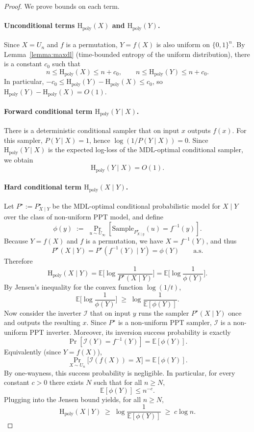 \documentclass[twoside]{article}
\newcommand{\E}{\mathbb{E}}
\newcommand{\rH}{\mathrm{H}}
\begin{document}
\begin{proof}
We prove bounds on each term.

\paragraph{Unconditional terms $\rH_{\mathrm{poly}}(X)$ and $\rH_{\mathrm{poly}}(Y)$.}
Since $X= U_n$ and $f$ is a permutation, $Y=f(X)$ is also uniform on $\{0,1\}^n$.
By Lemma~\ref{lemma:maxdl} (time-bounded entropy of the uniform distribution),
there is a constant $c_0$ such that
\[
n \le \rH_{\mathrm{poly}}(X) \le n+c_0,\qquad n \le \rH_{\mathrm{poly}}(Y) \le n+c_0.
\]
In particular, $-c_0 \leq \rH_{\mathrm{poly}}(Y)-\rH_{\mathrm{poly}}(X)\leq c_0$, so $\rH_{\mathrm{poly}}(Y)-\rH_{\mathrm{poly}}(X) = O(1)$.

\paragraph{Forward conditional term $\rH_{\mathrm{poly}}(Y\mid X)$.}
There is a deterministic conditional sampler that on input $x$ outputs $f(x)$.
For this sampler, $P(Y\mid X)=1$, hence $\log(1/P(Y\mid X))=0$.
Since $\rH_{\mathrm{poly}}(Y\mid X)$ is the expected log-loss of the MDL-optimal conditional sampler,
we obtain
\[
\rH_{\mathrm{poly}}(Y\mid X)=O(1).
\]

\paragraph{Hard conditional term $\rH_{\mathrm{poly}}(X\mid Y)$.}
Let $P^\star:=P^\star_{X\mid Y}$ be the MDL-optimal conditional probabilistic model for $X\mid Y$
over the class of non-uniform PPT model, and define
%
%
%
\[
\phi(y)\;:=\; \Pr_{u\sim U_\infty}\left[\mathrm{Sample}_{P^\star_{X\mid y}}(u) = f^{-1}(y)\right].
\]
Because $Y=f(X)$ and $f$ is a permutation, we have $X=f^{-1}(Y)$, and thus
\[
P^\star(X\mid Y)=P^\star(f^{-1}(Y)\mid Y)=\phi(Y)\qquad\text{a.s.}
\]
Therefore
\[
\rH_{\mathrm{poly}}(X\mid Y)
=\E\Big[\log\frac{1}{P^\star(X\mid Y)}\Big]
=\E\Big[\log\frac{1}{\phi(Y)}\Big].
\]
By Jensen's inequality for the convex function $\log(1/t)$,
\[
\E\Big[\log\frac{1}{\phi(Y)}\Big]\;\ge\;\log\frac{1}{\E[\phi(Y)]}.
\]
Now consider the inverter $\mathcal I$ that on input $y$ runs the sampler $P^\star(X\mid Y)$
once and outputs the resulting $x$. Since $P^\star$ is a non-uniform PPT sampler, $\mathcal I$
is a non-uniform PPT inverter. Moreover, its inversion success probability is exactly
\[
\Pr[\mathcal I(Y)=f^{-1}(Y)] = \E[\phi(Y)].
\]
Equivalently (since $Y=f(X)$),
\[
\Pr_{X\sim U_n}\big[\mathcal I(f(X))=X\big] = \E[\phi(Y)].
\]
By one-wayness, this success probability is negligible. In particular, for every constant
$c>0$ there exists $N$ such that for all $n\ge N$,
\[
\E[\phi(Y)] \le n^{-c}.
\]
Plugging into the Jensen bound yields, for all $n\ge N$,
\[
\rH_{\mathrm{poly}}(X\mid Y)\;\ge\;\log\frac{1}{\E[\phi(Y)]}\;\ge\; c\log n.
\]


\end{proof}
\end{document}
